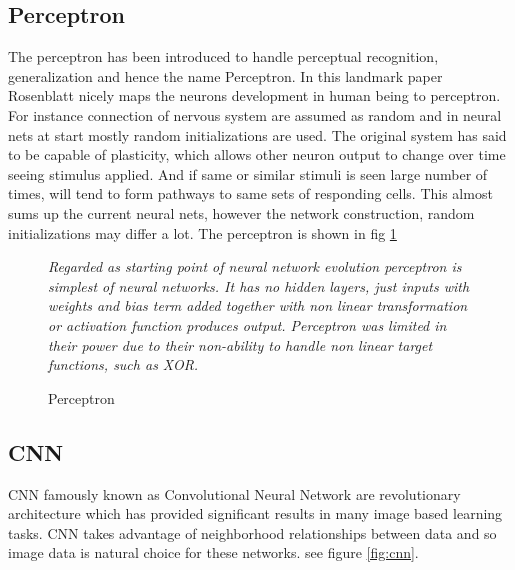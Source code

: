 \subsection{Perceptron}
The perceptron has been introduced to handle perceptual recognition, generalization and hence the name Perceptron. In this landmark paper Rosenblatt nicely maps the neurons development in human being to perceptron.
For instance connection of nervous system are assumed as random and in neural nets at start mostly random initializations are used.
The original system has said to be capable of plasticity, which allows other neuron output to change over time seeing stimulus applied. And if same or similar stimuli is seen large number of times, will tend to form pathways to same sets of responding cells. This almost sums up the current neural nets, however the network construction, random initializations may differ a lot. 
The perceptron is shown in fig \ref{fig:percep}
\begin{figure}[H]
	\centering
	\caption{\label{fig:percep} Perceptron}
	\medskip
	\small
	\begin{flushleft}
		\textit{Regarded as starting point of neural network evolution perceptron is simplest of neural networks. It has  no hidden layers, just inputs with weights and bias term added together with non linear transformation or activation function produces output. Perceptron was limited in their power due to their non-ability to handle non linear target functions, such as XOR.}
	\end{flushleft}
	
\end{figure}


\subsection{CNN}
CNN famously known as Convolutional Neural Network are revolutionary architecture which has provided significant results in many image based learning tasks. CNN takes advantage of neighborhood relationships between data and so image data is natural choice for these networks. see figure \ref{fig:cnn}.


